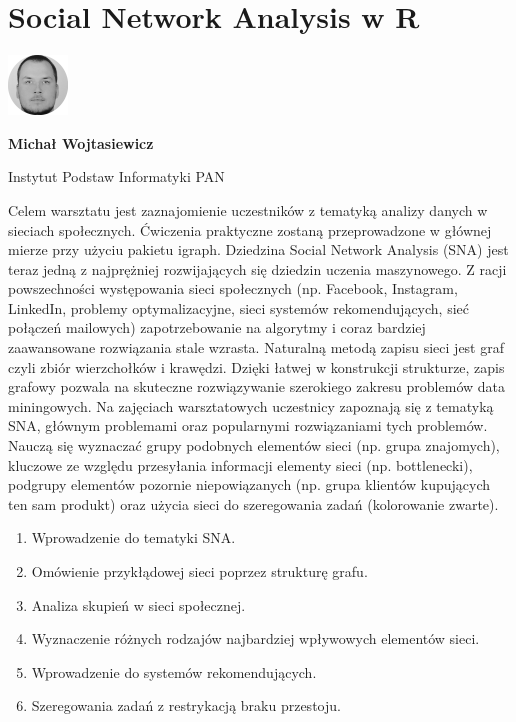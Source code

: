 \documentclass[\main/boa.tex]{subfiles}
\begin{document}
\section{Social Network Analysis w R}
\begin{minipage}[t]{0.915\textwidth}
	\center     
    \includegraphics[width=60px]{img/workshops/czarno_biale/pwojtasiewicz-crop.png} 
\end{minipage}

\begin{minipage}{0.915\textwidth}
\centering
{\bf {} Michał Wojtasiewicz}
\end{minipage}

\vskip 0.3cm

\begin{affiliations}
\begin{minipage}{0.915\textwidth}
\centering
\large Instytut Podstaw Informatyki PAN  \\[2pt]
\end{minipage}
\end{affiliations}

\vskip 0.8cm

\opiswarsztatu Celem warsztatu jest zaznajomienie uczestników z tematyką analizy danych w sieciach społecznych. Ćwiczenia praktyczne zostaną przeprowadzone w głównej mierze przy użyciu pakietu igraph. Dziedzina Social Network Analysis (SNA) jest teraz jedną z najprężniej rozwijających się dziedzin uczenia maszynowego. Z racji powszechności występowania sieci społecznych (np. Facebook, Instagram, LinkedIn, problemy optymalizacyjne, sieci systemów rekomendujących, sieć połączeń mailowych) zapotrzebowanie na algorytmy i coraz bardziej zaawansowane rozwiązania stale wzrasta. Naturalną metodą zapisu sieci jest graf czyli zbiór wierzchołków i krawędzi. Dzięki łatwej w konstrukcji strukturze, zapis grafowy pozwala na skuteczne rozwiązywanie szerokiego zakresu problemów data miningowych. Na zajęciach warsztatowych uczestnicy zapoznają się z tematyką SNA, głównym problemami oraz popularnymi rozwiązaniami tych problemów. Nauczą się wyznaczać grupy podobnych elementów sieci (np. grupa znajomych), kluczowe ze względu przesyłania informacji elementy sieci (np. bottlenecki), podgrupy elementów pozornie niepowiązanych (np. grupa klientów kupujących ten sam produkt) oraz użycia sieci do szeregowania zadań (kolorowanie zwarte).

\planwarsztatu
\begin{enumerate}
\item Wprowadzenie do tematyki SNA.
\item Omówienie przykłądowej sieci poprzez strukturę grafu.
\item Analiza skupień w sieci społecznej.
\item Wyznaczenie różnych rodzajów najbardziej wpływowych elementów sieci.
\item Wprowadzenie do systemów rekomendujących.
\item Szeregowania zadań z restrykacją braku przestoju.
\end{enumerate}	 
\end{document}
